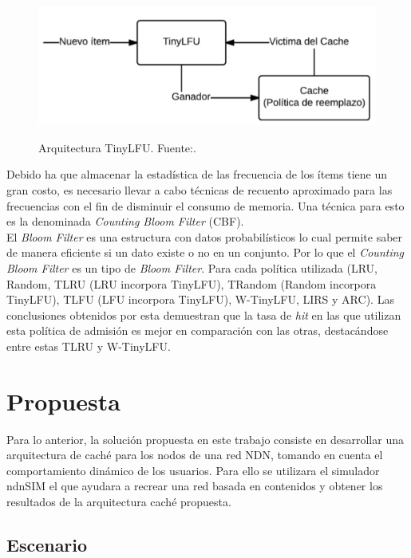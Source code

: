 \documentclass[12pt]{ociamthesis}  %
\begin{document}
\begin{figure}[!htb]
	\centering
	\includegraphics[width=12cm]{Imagenes/Politica_TinyLFU}\\
	\caption{Arquitectura TinyLFU. Fuente:.\cite{einziger2014tinylfu}}
	\label{clasificacion_consulta_cc_uc}
\end{figure}

Debido ha que almacenar la estadística de las frecuencia de los ítems tiene un gran costo, es necesario llevar a cabo técnicas de recuento aproximado para las frecuencias con el fin de disminuir el consumo de memoria. Una técnica para esto es la denominada \textit{Counting Bloom Filter} (CBF).\\

El \textit{Bloom Filter} es una estructura con datos probabilísticos lo cual permite saber de manera eficiente si un dato existe o no en un conjunto. Por lo que el \textit{Counting Bloom Filter} es un tipo de \textit{Bloom Filter}.
Para cada política utilizada (LRU, Random, TLRU (LRU incorpora TinyLFU), TRandom (Random incorpora TinyLFU), TLFU (LFU incorpora TinyLFU), W-TinyLFU, LIRS y ARC). Las conclusiones obtenidos por esta demuestran que la tasa de \textit{hit} en las que utilizan esta política de admisión es mejor en comparación con las otras, destacándose entre estas TLRU y W-TinyLFU.\\


\chapter{Propuesta}

Para lo anterior, la solución propuesta en este trabajo consiste en desarrollar una arquitectura de caché para los nodos de una red NDN, tomando en cuenta el comportamiento dinámico de los usuarios. Para ello se utilizara el simulador ndnSIM el que  ayudara a recrear una red basada en contenidos y obtener los resultados de la arquitectura caché propuesta.

\section{Escenario}
\end{document}
